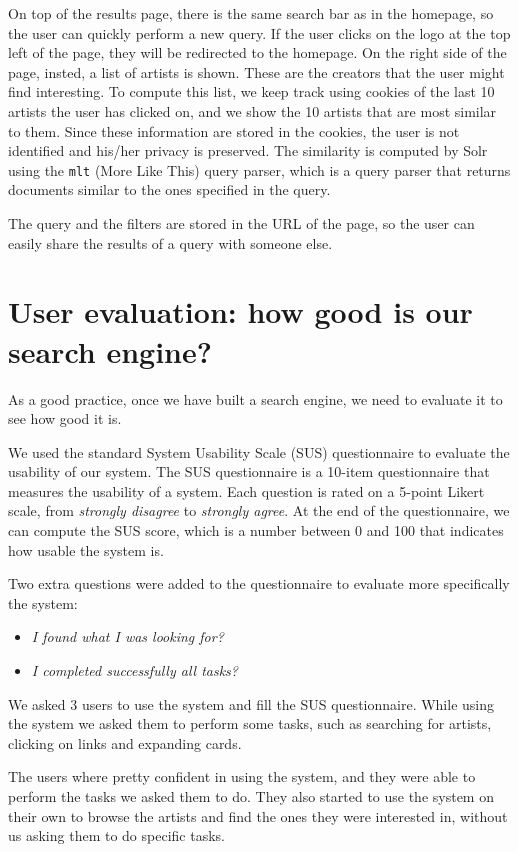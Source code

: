 \documentclass[tikz,14pt]{article}
\begin{document}
On top of the results page, there is the same search bar as in the homepage, so the user can quickly perform a new query.
If the user clicks on the logo at the top left of the page, they will be redirected to the homepage.
On the right side of the page, insted, a list of artists is shown. These are the creators that the user might find interesting.
To compute this list, we keep track using cookies of the last 10 artists the user has clicked on, and we show the 10 artists that are most similar to them.
Since these information are stored in the cookies, the user is not identified and his/her privacy is preserved.
The similarity is computed by Solr using the \texttt{mlt} (More Like This) query parser, which is a query parser that returns documents similar to the ones specified in the query.

The query and the filters are stored in the URL of the page, so the user can easily share the results of a query with someone else.


\section{User evaluation: how good is our search engine?} \label{sec:evaluation}
As a good practice, once we have built a search engine, we need to evaluate it to see how good it is.

We used the standard System Usability Scale (SUS) questionnaire to evaluate the usability of our system.
The SUS questionnaire is a 10-item questionnaire that measures the usability of a system.
Each question is rated on a 5-point Likert scale, from \textit{strongly disagree} to \textit{strongly agree}.
At the end of the questionnaire, we can compute the SUS score, which is a number between 0 and 100 that indicates how usable the system is.

Two extra questions were added to the questionnaire to evaluate more specifically the system:
\begin{itemize}
    \item \textit{I found what I was looking for?}
    \item \textit{I completed successfully all tasks?}
\end{itemize}

We asked 3 users to use the system and fill the SUS questionnaire.
While using the system we asked them to perform some tasks, such as searching for artists, clicking on links and expanding cards.

The users where pretty confident in using the system, and they were able to perform the tasks we asked them to do.
They also started to use the system on their own to browse the artists and find the ones they were interested in, without us asking them to do specific tasks.
\end{document}
